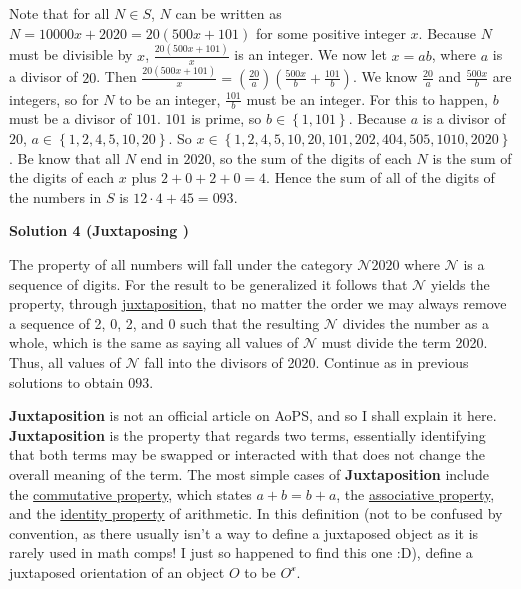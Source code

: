 \begin{enumerate}
Note that for all $N \in S$, $N$ can be written as $N=10000x+2020=20(500x+101)$ for some positive integer $x$. Because $N$ must be divisible by $x$, $\frac{20(500x+101)}{x}$ is an integer. We now let $x=ab$, where $a$ is a divisor of $20$. Then $\frac{20(500x+101)}{x}=(\frac{20}{a})( \frac{500x}{b}+\frac{101}{b})$. We know $\frac{20}{a}$ and $\frac{500x}{b}$ are integers, so for $N$ to be an integer, $\frac{101}{b}$ must be an integer. For this to happen, $b$ must be a divisor of $101$. $101$ is prime, so $b\in \left \{ 1, 101 \right \}$. Because $a$ is a divisor of $20$, $a \in \left \{ 1,2,4,5,10,20\right\}$. So $x \in \left\{1,2,4,5,10,20,101,202,404,505,1010,2020\right\}$. Be know that all $N$ end in $2020$, so the sum of the digits of each $N$ is the sum of the digits of each $x$ plus $2+0+2+0=4$. Hence the sum of all of the digits of the numbers in $S$ is $12 \cdot 4 +45=\boxed{093}$.

 



\textbf{Solution 4 (Juxtaposing )}

The property of all numbers will fall under the category $\mathcal{N}2020$ where $\mathcal{N}$ is a sequence of digits. For the result to be generalized it follows that $\mathcal{N}$ yields the property, through \href{https://artofproblemsolving.com/wiki/index.php?title=Juxtaposition&action=edit&redlink=1}{juxtaposition}, that no matter the order we may always remove a sequence of 2, 0, 2, and 0 such that the resulting $\mathcal{N}$ divides the number as a whole, which is the same as saying all values of $\mathcal{N}$ must divide the term 2020. Thus, all values of $\mathcal{N}$ fall into the divisors of 2020. Continue as in previous solutions to obtain $\boxed{093}$.

 \textbf{Juxtaposition} is not an official article on AoPS, and so I shall explain it here. \textbf{Juxtaposition} is the property that regards two terms, essentially identifying that both terms may be swapped or interacted with that does not change the overall meaning of the term. The most simple cases of \textbf{Juxtaposition} include the \href{https://artofproblemsolving.com/wiki/index.php?title=Commutative\_property}{commutative property}, which states $a+b = b+a$, the \href{https://artofproblemsolving.com/wiki/index.php?title=Associative\_property}{associative property}, and the \href{https://artofproblemsolving.com/wiki/index.php?title=Identity\_property&action=edit&redlink=1}{identity property} of arithmetic. In this definition (not to be confused by convention, as there usually isn't a way to define a juxtaposed object as it is rarely used in math comps! I just so happened to find this one :D), define a juxtaposed orientation of an object $O$ to be $O^\mathcal{x}$.


\end{enumerate}
